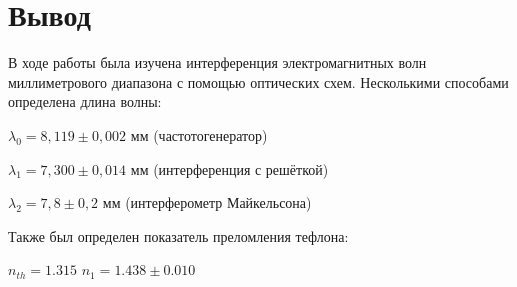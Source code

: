 \documentclass[a4paper,12pt]{article}
\begin{document}
\section{Вывод}
В ходе работы была изучена интерференция электромагнитных волн миллиметрового диапазона с помощью оптических схем. Несколькими способами определена длина волны:
\begin{center}

    $\lambda_0 = 8,119 \pm 0,002$ мм  (частотогенератор) \par
    $\lambda_1 = 7,300 \pm 0,014$ мм (интерференция с решёткой) \par
    $\lambda_2 = 7,8 \pm  0,2$ мм (интерферометр Майкельсона)
\end{center}
Также был определен показатель преломления тефлона:
\begin{center}
    $n_{th} = 1.315$ \hspace{1cm}
    $n_1 = 1.438 \pm0.010 $
\end{center}
\end{document}
